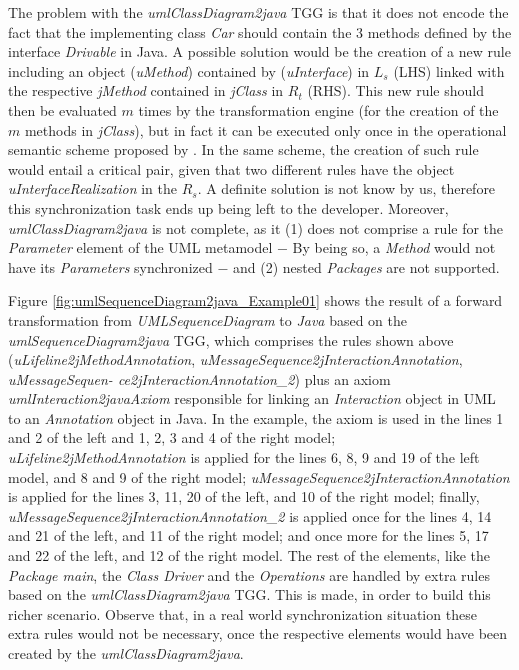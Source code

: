 \documentclass[tuberlin,cic,tc,english,noabntcite]{iiufrgs}
\begin{document}
The problem with the \emph{umlClassDiagram2java} TGG is that it does not encode the fact that the implementing class \emph{Car} should contain the $3$ methods defined by the interface \emph{Drivable} in Java. A possible solution would be the creation of a new rule including an object (\emph{uMethod}) contained by (\emph{uInterface}) in $L_s$ (LHS) linked with the respective \emph{jMethod} contained in \emph{jClass} in $R_t$ (RHS). This new rule should then be evaluated $m$ times by the transformation engine (for the creation of the $m$ methods in \emph{jClass}), but in fact it can be executed only once in the operational semantic scheme proposed by \citet[p. 9]{giese2010toward}. In the same scheme, the creation of such rule would entail a critical pair, given that two different rules have the object \emph{uInterfaceRealization} in the $R_s$. A definite solution is not know by us, therefore this synchronization task ends up being left to the developer. Moreover, \emph{umlClassDiagram2java} is not complete, as it (1) does not comprise a rule for the \emph{Parameter} element of the UML metamodel $-$ By being so, a \emph{Method} would not have its \emph{Parameters} synchronized $-$ and (2) nested \emph{Packages} are not supported.

Figure \ref{fig:umlSequenceDiagram2java_Example01} shows the result of a forward transformation from \emph{UMLSequenceDiagram} to \emph{Java} based on the \emph{umlSequenceDiagram2java} TGG, which comprises the rules shown above (\emph{uLifeline2jMethodAnnotation}, \emph{uMessageSequence2jInteractionAnnotation}, \emph{uMessageSequen- ce2jInteractionAnnotation\_2}) plus an axiom \emph{umlInteraction2javaAxiom} responsible for linking an \emph{Interaction} object in UML to an \emph{Annotation} object in Java. In the example, the axiom is used in the lines 1 and 2 of the left and 1, 2, 3 and 4 of the right model; \emph{uLifeline2jMethodAnnotation} is applied for the lines 6, 8, 9 and 19 of the left model, and 8 and 9 of the right model;  \emph{uMessageSequence2jInteractionAnnotation} is applied for the lines 3, 11, 20 of the left, and 10 of the right model; finally, \emph{uMessageSequence2jInteractionAnnotation\_2} is applied once for the lines 4, 14 and 21 of the left, and 11 of the right model; and once more for the lines 5, 17 and 22 of the left, and 12 of the right model. The rest of the elements, like the \emph{Package main}, the \emph{Class Driver} and the \emph{Operations} are handled by extra rules based on the \emph{umlClassDiagram2java} TGG. This is made, in order to build this richer scenario. Observe that, in a real world synchronization situation these extra rules would not be necessary, once the respective elements would have been created by the \emph{umlClassDiagram2java}.
\end{document}

